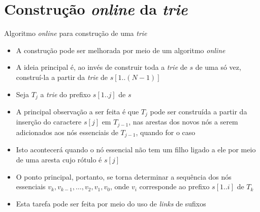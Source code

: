 \section{Construção {\it online} da {\it trie}}

\begin{frame}[fragile]{Algoritmo {\it online} para construção de uma {\it trie}}

    \begin{itemize}
        \item A construção pode ser melhorada por meio de um algoritmo \textit{online}
        \pause

        \item A ideia principal é, ao invés de construir toda a \textit{trie} de $s$ de uma só 
            vez, construí-la a partir da \textit{trie} de $s[1..(N-1)]$ 
        \pause

        \item Seja $T_j$ a \textit{trie} do prefixo $s[1..j]$ de $s$ 
        \pause

        \item A principal observação a ser feita é que $T_j$ pode ser construída a partir da 
            inserção do caractere $s[j]$ em $T_{j - 1}$, nas arestas dos novos nós a serem 
            adicionados aos nós essenciais de $T_{j - 1}$, quando for o caso
        \pause

        \item Isto acontecerá quando o nó essencial não tem um filho ligado a ele por meio de 
            uma aresta cujo rótulo é $s[j]$
        \pause

        \item O ponto principal, portanto, se torna determinar a sequência dos nós essenciais 
            $v_k, v_{k-1}, \ldots, v_2, v_1, v_0$, onde $v_i$ corresponde ao prefixo 
            $s[1..i]$ de $T_k$
        \pause

        \item Esta tarefa pode ser feita por meio do uso de \textit{links} de sufixos
    \end{itemize}

\end{frame}

